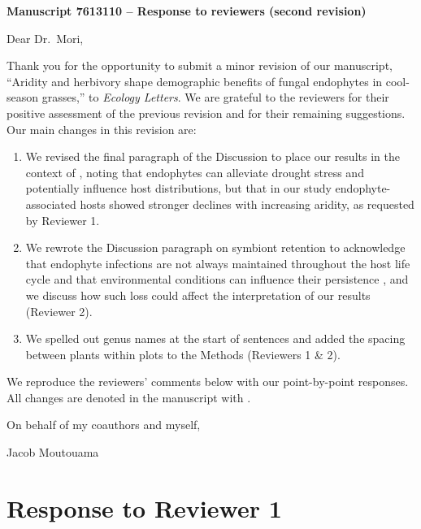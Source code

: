 \documentclass[12pt]{article}
\newcommand{\revise}[1]{{\color{Mahogany}{#1}}}
\begin{document}
\vspace*{-2em}
\begin{center}
{\LARGE\bfseries Manuscript 7613110 -- Response to reviewers (second revision)}
\end{center}
\vspace{1em}
\noindent Dear Dr.\ Mori,

Thank you for the opportunity to submit a minor revision of our manuscript, ``Aridity and herbivory shape demographic benefits of fungal endophytes in cool-season grasses,'' to \emph{Ecology Letters}. We are grateful to the reviewers for their positive assessment of the previous revision and for their remaining suggestions. Our main changes in this revision are:
\begin{enumerate}
	\item {We revised the final paragraph of the Discussion to place our results in the context of \citet{afkhami2014mutualist}, noting that endophytes can alleviate drought stress and potentially influence host distributions, but that in our study endophyte-associated hosts showed stronger declines with increasing aridity, as requested by Reviewer 1.}
	\item {We rewrote the Discussion paragraph on symbiont retention to acknowledge that endophyte infections are not always maintained throughout the host life cycle and that environmental conditions can influence their persistence \citep{afkhami2008symbiosis,david2019testing}, and we discuss how such loss could affect the interpretation of our results (Reviewer 2).}
	\item {We spelled out genus names at the start of sentences and added the spacing between plants within plots to the Methods (Reviewers 1 \& 2).}
\end{enumerate}

We reproduce the reviewers' comments below with our point-by-point responses. All changes are denoted in the manuscript with \revise{Mahogany font}.

\vspace{2em}
\hfill On behalf of my coauthors and myself,

\hfill Jacob Moutouama
\newpage

\section{Response to Reviewer 1}
\vspace{-2em}
\end{document}
